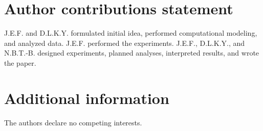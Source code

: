 \documentclass[11pt,letterpaper]{article}
\begin{document}
\section*{Author contributions statement}

J.E.F. and D.L.K.Y. formulated initial idea, performed computational modeling, and analyzed data. J.E.F. performed the experiments. J.E.F., D.L.K.Y., and N.B.T.-B. designed experiments, planned analyses, interpreted results, and wrote the paper.

\section*{Additional information}

The authors declare no competing interests.



\setlength{\bibleftmargin}{.125in}
\setlength{\bibindent}{-\bibleftmargin}

\newpage

\end{document}
